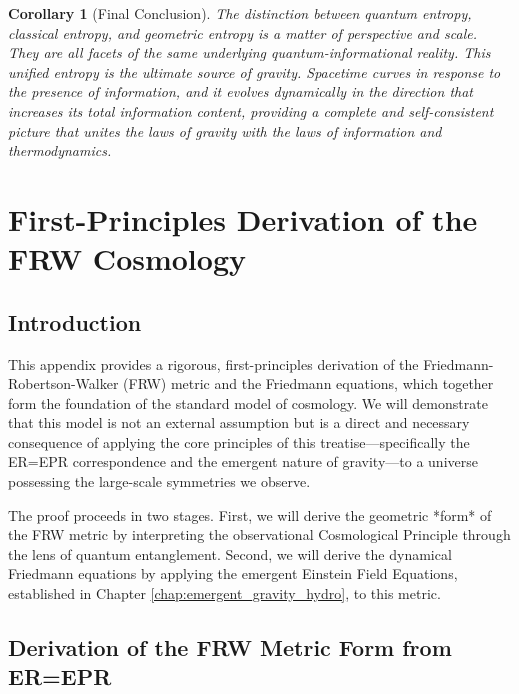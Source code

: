 \documentclass[11pt, letterpaper]{report}
\theoremstyle{plain} %
\newtheorem{corollary}[theorem]{Corollary}
\theoremstyle{definition} %
\theoremstyle{remark} %
\begin{document}
\begin{corollary}[Final Conclusion]
The distinction between quantum entropy, classical entropy, and geometric entropy is a matter of perspective and scale. They are all facets of the same underlying quantum-informational reality. This unified entropy is the ultimate source of gravity. Spacetime curves in response to the presence of information, and it evolves dynamically in the direction that increases its total information content, providing a complete and self-consistent picture that unites the laws of gravity with the laws of information and thermodynamics.
\end{corollary}


\appendix
\chapter{First-Principles Derivation of the FRW Cosmology}
\label{app:frw_derivation}

\section{Introduction}

This appendix provides a rigorous, first-principles derivation of the Friedmann-Robertson-Walker (FRW) metric and the Friedmann equations, which together form the foundation of the standard model of cosmology. We will demonstrate that this model is not an external assumption but is a direct and necessary consequence of applying the core principles of this treatise—specifically the ER=EPR correspondence and the emergent nature of gravity—to a universe possessing the large-scale symmetries we observe.

The proof proceeds in two stages. First, we will derive the geometric *form* of the FRW metric by interpreting the observational Cosmological Principle through the lens of quantum entanglement. Second, we will derive the dynamical Friedmann equations by applying the emergent Einstein Field Equations, established in Chapter \ref{chap:emergent_gravity_hydro}, to this metric.

\section{Derivation of the FRW Metric Form from ER=EPR}
\label{app:frw_metric_derivation}
\end{document}
